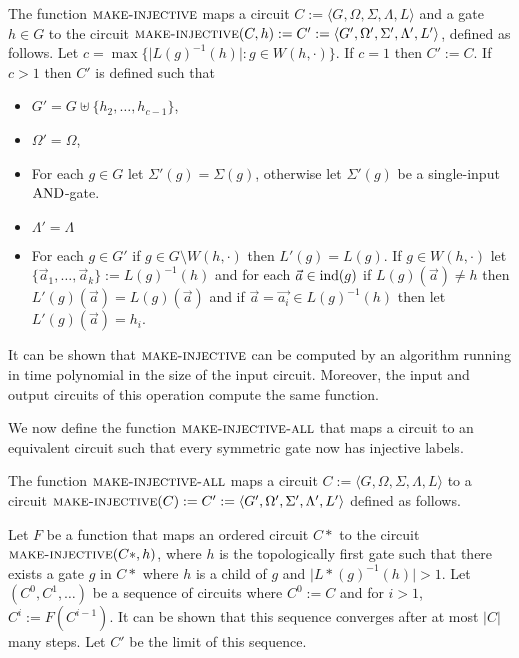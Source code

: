 \documentclass[../paper.tex]{subfiles}
\begin{document}
\begin{definition}
  \label{def:make-injective}
  The function ${\normalfont\textsc{make-injective}}$ maps a circuit $C := \langle G, \Omega,
  \Sigma , \Lambda, L \rangle$ and a gate $h \in G$ to the circuit
  ${\normalfont\textsc{make-injective}}(C, h) := C' := \langle G', \Omega', \Sigma', \Lambda', L'
  \rangle$, defined as follows. Let $c = \max \{\vert L(g)^{-1}(h)\vert : g \in
  W(h, \cdot)\}$. If $c = 1$ then $C' := C$. If $c > 1$ then $C'$ is defined
  such that
  \begin{itemize}
    \setlength\itemsep{0mm}
  \item $G' = G \uplus \{h_2, \ldots, h_{c-1}\}$,
  \item $\Omega' = \Omega$,
  \item For each $g \in G$ let $\Sigma' (g) = \Sigma(g)$, otherwise let
    $\Sigma'(g)$ be a single-input $\text{\upshape AND}$-gate.
  \item $\Lambda'= \Lambda$
  \item For each $g \in G'$ if $g \in G \setminus W(h, \cdot)$ then $L'(g) =
    L(g)$. If $g \in W(h, \cdot)$ let $\{\vec{a}_1, \ldots, \vec{a}_k\} :=
    L(g)^{-1}(h)$ and for each $\vec{a} \in \text{\upshape ind}(g)$ if $L(g)(\vec{a}) \neq h$
    then $L'(g)(\vec{a}) = L(g)(\vec{a})$ and if $\vec{a} = \vec{a_i} \in
    L(g)^{-1}(h)$ then let $L'(g)(\vec{a}) = h_i$.
  \end{itemize}
\end{definition}

It can be shown that ${\normalfont\textsc{make-injective}}$ can be computed by an algorithm
running in time polynomial in the size of the input circuit. Moreover, the input
and output circuits of this operation compute the same function.


We now define the function ${\normalfont\textsc{make-injective-all}}$ that maps a circuit to an
equivalent circuit such that every symmetric gate now has injective labels.

\begin{definition}
  The function ${\normalfont\textsc{make-injective-all}}$ maps a circuit $C := \langle G, \Omega,
  \Sigma , \Lambda, L \rangle$ to a circuit ${\normalfont\textsc{make-injective}}(C) := C' :=
  \langle G', \Omega', \Sigma', \Lambda', L' \rangle$ defined as follows.

  Let $F$ be a function that maps an ordered circuit $C*$ to the circuit
  ${\normalfont\textsc{make-injective}}(C*, h)$, where $h$ is the topologically first gate such
  that there exists a gate $g$ in $C*$ where $h$ is a child of $g$ and $\vert
  L*(g)^{-1}(h) \vert > 1$. Let $(C^0, C^1, \ldots)$ be a sequence of circuits
  where $C^0 := C$ and for $i > 1$, $C^i := F(C^{i-1})$. It can be shown that
  this sequence converges after at most $\vert C \vert$ many steps. Let $C'$ be
  the limit of this sequence.
\end{definition}
\end{document}
